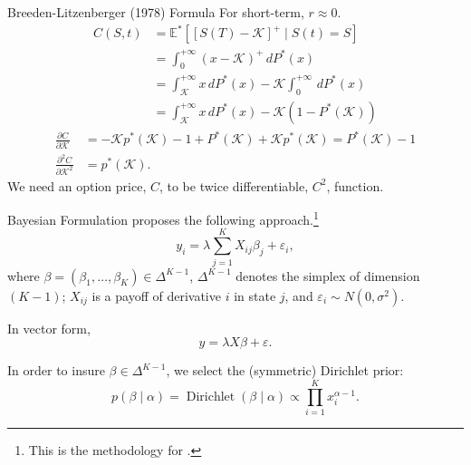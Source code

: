 \documentclass[10pt,aspectratio=43]{beamer}
\begin{document}
\begin{frame}{Breeden-Litzenberger (1978) Formula}
\nocite{breedenPricesStateContingentClaims1978}
For short-term, $r\approx 0$.
    \begin{align*}
        C(S,t)&=\mathbb{E}^*\left[[S(T)-\mathcal{K}]^+\mid S(t)=S\right]\\ 
        &=\int_0^{+\infty}(x-\mathcal{K})^+\,dP^*(x)\\ &=\int_{\mathcal{K}}^{+\infty}x\,dP^*(x)-\mathcal{K}\int_0^{+\infty}\,dP^*(x)\\ 
        &=\int_{\mathcal{K}}^{+\infty}x\,dP^*(x)-\mathcal{K}(1-P^*(\mathcal{K}))
    \end{align*}
    \begin{align*}
        \frac{\partial C}{\partial \mathcal{K}}&=-\mathcal{K}p^*(\mathcal{K})-1+P^*(\mathcal{K})+\mathcal{K}p^*(\mathcal{K})=P^*(\mathcal{K})-1\\ 
        \frac{\partial^2 C}{\partial \mathcal{K}^2}&=p^*(\mathcal{K}).
    \end{align*}
   We need an option price, $C$, to be twice differentiable, $C^2$, function. 
\end{frame}


\begin{frame}{Bayesian Formulation}
    \cite{fisherSimplexRegression2016} proposes the following approach.\footnote[frame]{\tiny This is the methodology for \cite{MarketProbabilityTracker}.}
\vspace{-2ex}
    \[y_i=\lambda\sum_{j=1}^KX_{ij}\beta_j+\varepsilon_i,\]
    where $\beta=(\beta_1,\dots, \beta_K)\in \Delta^{K-1}$, $\Delta^{K-1}$ denotes the simplex of dimension $(K-1)$; $X_{ij}$ is a payoff of derivative $i$ in state $j$, and $\varepsilon_i\sim N(0,\sigma^2)$.

    In vector form,
    \[y=\lambda X \beta+\varepsilon.\]

\vspace{-2ex}
    In order to insure $\beta\in \Delta^{K-1}$, we select the (symmetric) Dirichlet prior:
    \[p(\beta\mid \alpha)=\operatorname{Dirichlet}(\beta\mid \alpha)\propto \prod_{i=1}^{K}x_{i}^{\alpha-1}.\]

\end{frame}
\end{document}
